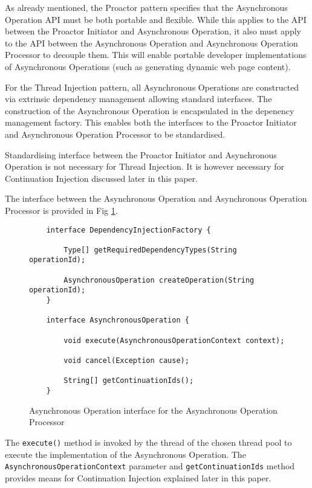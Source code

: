 \documentclass{article}
\begin{document}
As already mentioned, the Proactor pattern specifies that the Asynchronous
Operation API must be both portable and flexible.  While this applies to the API
between the Proactor Initiator and Asynchronous Operation, it also must apply to
the API between the Asynchronous Operation and Asynchronous Operation Processor
to decouple them.  This will enable portable developer implementations of
Asynchronous Operations (such as generating dynamic web page content). 

For the Thread Injection pattern, all Asynchronous Operations are constructed
via extrinsic dependency management \cite{ioc} allowing standard interfaces.
The construction of the Asynchronous Operation is encapsulated in the depenency
management factory.  This enables both the interfaces to the Proactor Initiator
and Asynchronous Operation Processor to be standardised.

Standardising interface between the Proactor Initiator and Asynchronous
Operation is not necessary for Thread Injection.  It is however necessary for
Continuation Injection discussed later in this paper.

The interface between the Asynchronous Operation and Asynchronous Operation
Processor is provided in Fig \ref{fig:AO_interface_AOP}.

\begin{figure}[!t]
\begin{verbatim}
    interface DependencyInjectionFactory {
    
        Type[] getRequiredDependencyTypes(String operationId);
        
        AsynchronousOperation createOperation(String operationId);
    }

    interface AsynchronousOperation {
    
        void execute(AsynchronousOperationContext context);
        
        void cancel(Exception cause);
        
        String[] getContinuationIds();
    }
\end{verbatim}
\caption[Caption for Code]{Asynchronous Operation interface for the Asynchronous Operation Processor}
\label{fig:AO_interface_AOP}
\end{figure}

The \texttt{execute()} method is invoked by the thread of the chosen thread pool
to execute the implementation of the Asynchronous Operation.  The
\texttt{AsynchronousOperationContext} parameter and \texttt{getContinuationIds}
method provides means for Continuation Injection explained later in this paper.
\end{document}

